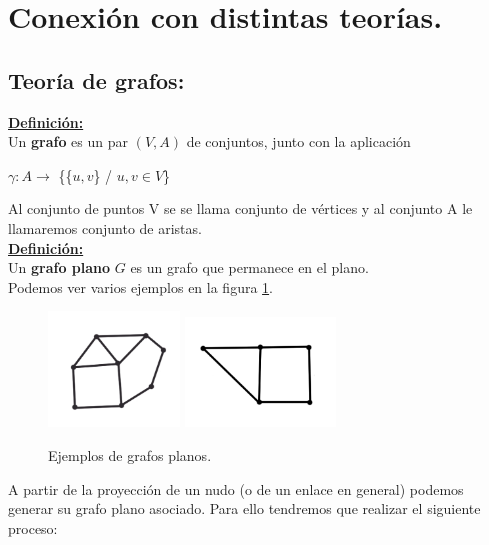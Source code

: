 \section{Conexión con distintas teorías.}\label{seccion7}
\begin{center}
	\item \subsection{Teoría de grafos:}
\end{center}

\underline{\textbf{Definición:}}\\
Un \textbf{grafo} es un par $ (V,A) $ de conjuntos, junto con la aplicación 
\begin{center}
	 $  \gamma :A \rightarrow$ \{\{$u,v$\} / $u,v \in V$\}  
\end{center}
Al conjunto de puntos V se se llama conjunto de vértices y al conjunto A le llamaremos conjunto de aristas. \\

\underline{\textbf{Definición:}}\\
Un \textbf{grafo plano} $ G $ es un grafo que permanece en el plano.\\

Podemos ver varios ejemplos en la figura \ref{graf1}.\\
\begin{figure}[h!]
	\centering
	\includegraphics[width=3.5cm]{inudos/grafo.png}
	\includegraphics[width=4cm]{inudos/pgrafo.png}
	\caption{Ejemplos de grafos planos.}
	\label{graf1} 
\end{figure}

A partir de la proyección de un nudo (o de un enlace en general) podemos generar su grafo plano asociado. Para ello tendremos que realizar el siguiente proceso:\\

